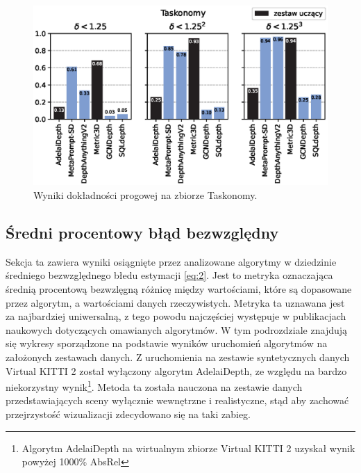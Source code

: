 \begin{figure}[H]
    \centering
    \includegraphics{plots/delta/6}
    \caption{Wyniki dokładności progowej na zbiorze Taskonomy.}
    \label{fig:delta_6}
\end{figure}

\subsection{Średni procentowy błąd bezwzględny}
Sekcja ta zawiera wyniki osiągnięte przez analizowane algorytmy w dziedzinie średniego bezwzględnego błedu estymacji \ref{eq:2}. Jest to metryka oznaczająca średnią procentową bezwzlęgną różnicę między wartościami, które są dopasowane przez algorytm, a wartościami danych rzeczywistych. Metryka ta uznawana jest za najbardziej uniwersalną, z tego powodu najczęściej występuje w publikacjach naukowych dotyczących omawianych algorytmów. W tym podrozdziale znajdują się wykresy sporządzone na podstawie wyników uruchomień algorytmów na założonych zestawach danych. Z uruchomienia na zestawie syntetycznych danych Virtual KITTI 2 został wyłączony algorytm AdelaiDepth, ze względu na bardzo niekorzystny wynik\footnote{Algorytm AdelaiDepth na wirtualnym zbiorze Virtual KITTI 2 uzyskał wynik powyżej 1000\% AbsRel}. Metoda ta została nauczona na zestawie danych przedstawiających sceny wyłącznie wewnętrzne i realistyczne, stąd aby zachować przejrzystość wizualizacji zdecydowano się na taki zabieg.

